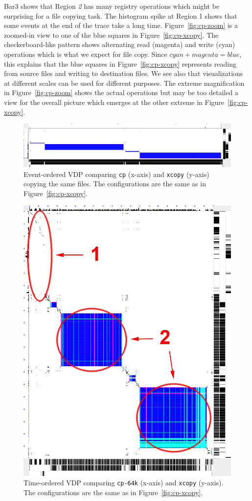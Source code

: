 Bar3 shows that Region {\em 2} has many registry operations which might
be surprising for a file copying task.
The histogram spike at Region 1 shows that some events at the end of the
trace take a long time.
Figure~\ref{fig:cp-zoom} is a zoomed-in view to one of the blue squares in
Figure~\ref{fig:cp-xcopy}.
The checkerboard-like pattern shows alternating read (magenta) and write
(cyan) operations which is what we expect for file copy.
Since $cyan+magenta=blue$,
this explains that the blue squares in Figure~\ref{fig:cp-xcopy} represents
reading from source files and writing to destination files.
We see also that visualizations at different scales can be used for
different purposes.
The extreme magnification in Figure~\ref{fig:cp-zoom}
shows the actual operations but may be too detailed a view for
the overall picture which emerges at the other extreme in 
Figure~\ref{fig:cp-xcopy}.

\begin{figure}[tbh]
\begin{center}
\includegraphics[width=1.0\columnwidth]{lviz/cp-xvc.png}
\caption{Event-ordered VDP comparing {\tt cp} (x-axis) and {\tt xcopy} (y-axis) copying
the same files. 
The configurations are the same as in Figure~\ref{fig:cp-xcopy}.
}
\label{fig:cp-xvc}
\end{center}
\end{figure}
%
\begin{figure}[htb]
\begin{center}
\includegraphics[width=0.5\columnwidth]{lviz/cp-64k.png}
\caption{Time-ordered VDP comparing {\tt cp-64k} (x-axis)
and {\tt xcopy} (y-axis).
The configurations are the same as in Figure~\ref{fig:cp-xcopy}.
}
\label{fig:cp-64k}
\end{center}
\end{figure}

